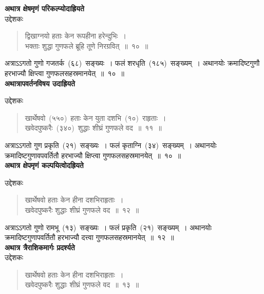 \documentclass[11pt, openany]{book}
\begin{document}
\indent
\textbf{अथात्र क्षेषमृणं परिकल्प्योदाह्रियते\textendash}\\

उद्देशकः\textendash 
\begin{quote}
{\ku द्विखाग्नयो हताः केन रूपहीना हरेन्दुभिः~।\\
भक्ताः शुद्धा गुणफले ब्रूहि तूणे निरग्रवित्~॥~१०~॥}
\end{quote}

\indent
अत्राऽऽगतो गुणो गजतर्क~(६८)~सङ्ख्यः~। फलं शरधृति~(१८५)~सङ्ख्यम्~। अथानयोः क्रमादिष्टगुणौ हरभाज्यौ क्षिप्त्वा गुणफलसहस्रमानयेत्~॥~१०~॥\\

\indent
\textbf{अथात्रापवर्तनविषय उदाह्रियते\textendash\\}

उद्देशकः\textendash 

\begin{quote}
{\ku खार्थेषवो~(५५०)~हताः केन युता दशभि~(१०)~राहृताः~।\\
खवेदपुष्करैः~(३४०)~शुद्धाः शीघ्रं गुणफले वद~॥~११~॥}
\end{quote}

\indent
अत्राऽऽगतो गुण प्रकृति~(२१)~सङ्ख्यः~। फलं कृताग्नि~(३४)~सङ्ख्यम्~। अथानयोः क्रमादिष्टगुणावपवर्तितौ हरभाज्यौ क्षिप्त्वा गुणफलसहस्रमानयेत्~॥~१०~॥\\

\indent
\textbf{अथात्र क्षेपमृणं कल्पयित्वोदह्रियते\textendash}

\newpage
\thispagestyle{fancy}
\fancyhf{}

उद्देशकः\textendash
\begin{quote}
{\ku खार्थेषवो हताः केन हीना दशभिराहृताः~।\\
खवेदपुष्करैः शुद्धाः शीघ्रं गुणफले वद~॥~१२~॥}
\end{quote}

\indent
अत्राऽऽगतो गुणो रामभू~(१३)~सङ्ख्यः~। फलं प्रकृति~(२१)~सङ्ख्यम्~। अथानयोः क्रमादिष्टगुणापवर्तितौ हरभाज्यौ दत्त्वा गुणफलसहस्रमानयेत्~॥~१२~॥\\

\indent
\textbf{अथात्र त्रैराशिकमार्गः प्रदर्श्यते\textendash}\\

उद्देशकः\textendash
\begin{quote}
{\ku खार्थेषवो हताः केन हीना दशभिराहृताः~।\\
खवेदपुष्करैः शुद्धाः शीघ्रं गुणफले वद~॥~१३~॥}
\end{quote}
\end{document}
